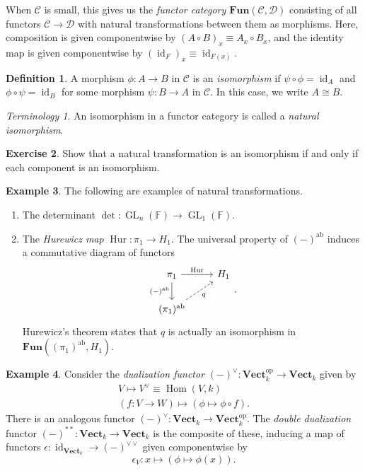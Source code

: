 \documentclass[10pt,letterpaper,cm]{nupset}
\theoremstyle{definition}
\newtheorem{definition}{Definition}[subsection]
\newtheorem{exmp}[definition]{Example}
\theoremstyle{theorem}
\newtheorem{exercise}[definition]{Exercise}
\theoremstyle{remark}
\newtheorem*{term}{Terminology}
\newcommand{\1}{\mathbf{1}}
\renewcommand{\c}{\mathscr{C}}
\renewcommand{\d}{\mathscr{D}}
\newcommand{\0}{\vec 0}
\DeclareMathOperator*{\GL}{GL}
\DeclareMathOperator{\id}{\mathrm{id}}
\DeclareMathOperator{\op}{op}
\DeclareMathOperator{\ab}{ab}
\DeclareMathOperator{\hur}{Hur}
\DeclareMathOperator{\Hom}{Hom}
\begin{document}
When $\c$ is small, this gives us the \textit{functor category $\mathbf{Fun}(\c, \d)$} consisting of all functors $\c \to \d$ with natural transformations between them as morphisms. Here, composition is given componentwise by $\left(A \circ B\right)_x \equiv A_x\circ B_x$, and the identity map is given componentwise by $\left(\id_F\right)_x \equiv \id_{F(x)}$.

\smallskip

\begin{definition}
A morphism $\phi : A \to B$ in $\c$ is an \textit{isomorphism} if $\psi \circ \phi = \id_A$ and $\phi \circ \psi = \id_B$ for some morphism $\psi : B \to A$ in $\c$. In this case, we write $A\cong B$.
\end{definition}

\begin{term}
An isomorphism in a functor category is called a \textit{natural isomorphism}.
\end{term}

\begin{exercise}
Show that a natural transformation is an isomorphism if and only if each component is an isomorphism.
\end{exercise}

\smallskip

\begin{exmp} The following are examples of natural transformations.
\begin{enumerate}
\item The determinant $\det : \GL_n(\mathbb{F}) \to \GL_1(\mathbb{F})$.
\item The \textit{Hurewicz map} $\hur: \pi_1 \to H_1$.  The universal property of $\left({-}\right)^{\ab}$ induces a commutative diagram of functors
\[
\begin{tikzcd}
\pi_1 \arrow[r, "\hur"] \arrow[d, "(-)^{\ab}"'] & H_1 \\
(\pi_1)^{\ab} \arrow[ru, "q"', dashed] & 
\end{tikzcd}
.\] Hurewicz's theorem states that $q$ is actually an isomorphism in $\mathbf{Fun}(\left(\pi_1\right)^{\ab}, H_1)$.
\end{enumerate}
\end{exmp}

\smallskip

\begin{exmp}
Consider the \textit{dualization functor} $\left({-}\right)^{\vee} : \mathbf{Vect}_k^{\op}  \to \mathbf{Vect}_k$ given by
\begin{gather*}
V \mapsto V^{\vee} \equiv \Hom(V, k)
\\ \left(f: V \to W\right) \mapsto \left( \phi \mapsto \phi \circ f\right).
\end{gather*}  
There is an analogous functor $\left({-}\right)^{\vee} : \mathbf{Vect}_k \to \mathbf{Vect}_k^{\op}$. The \textit{double dualization} functor $\left({-}\right)^{\ast \ast}: \mathbf{Vect}_k \to \mathbf{Vect}_k$ is the composite of these, inducing a map of functors $\epsilon: \id_{\mathbf{Vect}_k} \to (-)^{\vee \vee}$ given componentwise by $$\epsilon_V : x \mapsto \left(\phi \mapsto \phi(x)\right).$$
\end{exmp}
\end{document}

